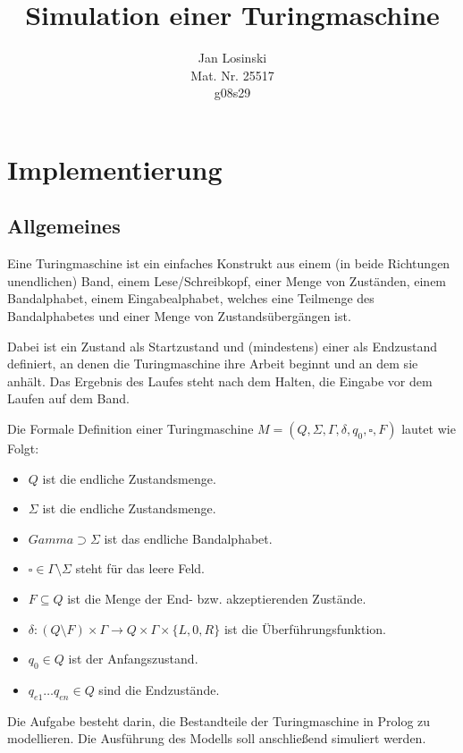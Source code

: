 \documentclass[final,a4paper,11pt,notitlepage,halfparskip]{scrreprt}
\title{Simulation einer Turingmaschine}
\author{Jan Losinski\\
\small{Mat. Nr. 25517}\\
\small{g08s29}}
\begin{document}
\maketitle

\tableofcontents

\chapter{Implementierung}
\section{Allgemeines}
Eine Turingmaschine ist ein einfaches Konstrukt aus einem (in beide 
Richtungen unendlichen) Band, einem Lese/Schreibkopf, einer Menge von
Zuständen, einem Bandalphabet, einem Eingabealphabet, welches eine
Teilmenge des Bandalphabetes und einer Menge von Zustandsübergängen ist.

Dabei ist ein Zustand als Startzustand und (mindestens) einer als
Endzustand definiert, an denen die Turingmaschine ihre Arbeit beginnt
und an dem sie anhält. Das Ergebnis des Laufes steht nach dem Halten, 
die Eingabe vor dem Laufen auf dem Band.

Die Formale Definition einer Turingmaschine $M=(Q, \Sigma, \Gamma,
\delta, q_0, \square, F)$ lautet wie Folgt:

\begin{itemize}
    \item  $Q$ ist die endliche Zustandsmenge.
    \item  $\Sigma$ ist die endliche Zustandsmenge.
    \item  $Gamma \supset \Sigma$ ist das endliche Bandalphabet.
    \item  $\square \in \Gamma\setminus\Sigma$ steht für das leere Feld.
    \item  $F \subseteq Q$ ist die Menge der End- bzw. akzeptierenden Zustände.
    \item  $\delta: (Q \setminus F)\times \Gamma \rightarrow Q \times
	\Gamma \times \{ L, 0, R \}$ ist die Überführungsfunktion.
    \item  $q_0 \in Q$ ist der Anfangszustand.  	
    \item  $q_{e1} \dots q_{en} \in Q$ sind die Endzustände.  	
\end{itemize}

Die Aufgabe besteht darin, die Bestandteile der Turingmaschine in Prolog
zu modellieren. Die Ausführung des Modells soll anschließend simuliert
werden.
\end{document}
